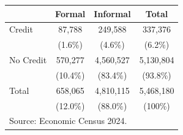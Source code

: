 \centering
\begin{tabular}{l*{2}{c}*{1}{c}}
\hline\hline
          & Formal & Informal & Total \\
\hline
Credit    & 87,788  & 249,588 & 337,376 \\
          & (1.6\%)  & (4.6\%) & (6.2\%) \\
No Credit & 570,277 & 4,560,527 & 5,130,804   \\
          & (10.4\%)  & (83.4\%) & (93.8\%) \\
\hline
Total     & 658,065 & 4,810,115 & 5,468,180 \\
          & (12.0\%)  & (88.0\%) & (100\%) \\
\hline\hline
\multicolumn{4}{l}{\footnotesize Source: Economic Census 2024.}
\end{tabular}